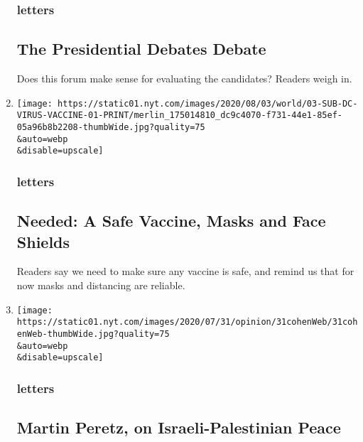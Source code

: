 \begin{enumerate}
  \hypertarget{letters-2}{%
  \subsubsection{letters}\label{letters-2}}

  \hypertarget{the-presidential-debates-debate}{%
  \subsection{The Presidential Debates
  Debate}\label{the-presidential-debates-debate}}

  Does this forum make sense for evaluating the candidates? Readers
  weigh in.
\item
  \href{/2020/08/06/opinion/letters/coronavirus-vaccine.html}{}

  \texttt{[image: https://static01.nyt.com/images/2020/08/03/world/03-SUB-DC-VIRUS-VACCINE-01-PRINT/merlin\_175014810\_dc9c4070-f731-44e1-85ef-05a96b8b2208-thumbWide.jpg?quality=75\\\&auto=webp\\\&disable=upscale]}

  \hypertarget{letters-3}{%
  \subsubsection{letters}\label{letters-3}}

  \hypertarget{needed-a-safe-vaccine-masks-and-face-shields}{%
  \subsection{Needed: A Safe Vaccine, Masks and Face
  Shields}\label{needed-a-safe-vaccine-masks-and-face-shields}}

  Readers say we need to make sure any vaccine is safe, and remind us
  that for now masks and distancing are reliable.
\item
  \href{/2020/08/06/opinion/letters/israel-palestinians.html}{}

  \texttt{[image: https://static01.nyt.com/images/2020/07/31/opinion/31cohenWeb/31cohenWeb-thumbWide.jpg?quality=75\\\&auto=webp\\\&disable=upscale]}

  \hypertarget{letters-4}{%
  \subsubsection{letters}\label{letters-4}}

  \hypertarget{martin-peretz-on-israeli-palestinian-peace}{%
  \subsection{Martin Peretz, on Israeli-Palestinian
  Peace}\label{martin-peretz-on-israeli-palestinian-peace}}


\end{enumerate}
